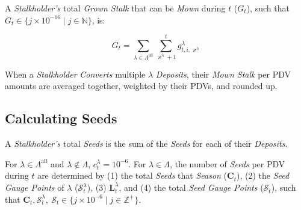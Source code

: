 \documentclass[tikz]{article}
\makeatletter
\newenvironment{keepunit}{%
  \par\penalty0\begingroup
  \edef\keepunitparskip{\the\parskip}%
  \noindent\begin{minipage}[t]{\linewidth}%
  \setlength{\parskip}{\keepunitparskip}%
  \@minipagefalse
}{%
  \end{minipage}\par\endgroup
}
\newcommand{\term}[1]{\textsl{#1}}
\makeatother
\begin{document}
\begin{keepunit}
A \term{Stalkholder's} total \term{Grown Stalk} that can be \term{Mown} during $t$ ($G_{t}$), such that $G_{t} \in \{j \times 10^{-16} \mid j \in \mathbb{N} \}$, is:

    $$
        G_{t} = 
            \sum_{\lambda \in \Lambda^{\text{all}}}
                \sum_{\varkappa^{\lambda} + 1}^{t} 
                    g_{t,i,\varkappa^{\lambda}}^{\lambda}
    $$
\end{keepunit}

When a \term{Stalkholder} \term{Converts} multiple $\lambda$ \term{Deposits}, their \term{Mown Stalk} per PDV amounts are averaged together, weighted by their PDVs, and rounded up.


\vspace*{-1mm}
\subsection{Calculating Seeds}
\vspace*{-1mm}

A \term{Stalkholder's} total \term{Seeds} is the sum of the \term{Seeds} for each of their \term{Deposits}.

For $\lambda \in \Lambda^{\text{all}}$ and $\lambda \notin \Lambda$, $c_{t}^{\lambda}=10^{-6}$. For $\lambda \in \Lambda$, the number of \term{Seeds} per PDV during $t$ are determined by (1) the total \term{Seeds} that \term{Season} ($\mathbf{C}_{t}$), (2) the \term{Seed Gauge Points} of $\lambda$ ($\mathscr{S}_{t}^{\lambda}$), (3) $\mathbf{L}_{t}^{\lambda}$, and (4) the total \term{Seed Gauge Points} ($\mathscr{S}_{t}$), such that $\mathbf{C}_{t}, \mathscr{S}_{t}^{\lambda},\ \mathscr{S}_{t} \in \{j \times 10^{-6} \mid j \in \mathbb{Z}^{+} \}$.
\end{document}
